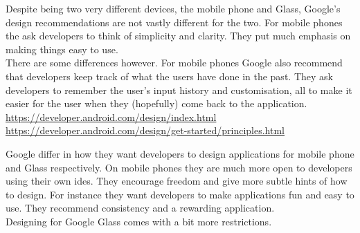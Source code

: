 Despite being two very different devices, the mobile phone and Glass, Google's design recommendations are not vastly different for the two. For mobile phones the ask developers to think of simplicity and clarity. They put much emphasis on making things easy to use.\\

There are some differences however. For mobile phones Google also recommend that developers keep track of what the users have done in the past. They ask developers to remember the user's input history and customisation, all to make it easier for the user when they (hopefully) come back to the application.
\url{https://developer.android.com/design/index.html}\\

\url{https://developer.android.com/design/get-started/principles.html}







Google differ in how they want developers to design applications for mobile phone and Glass respectively. On mobile phones they are much more open to developers using their own ides. They encourage freedom and give more subtle hints of how to design. For instance they want developers to make applications fun and easy to use. They recommend consistency and a rewarding application.\\

Designing for Google Glass comes with a bit more restrictions. \\








